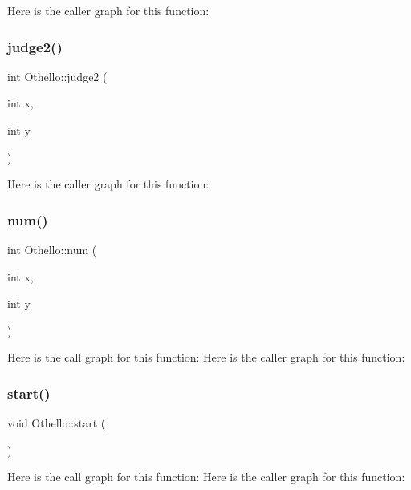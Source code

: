 Here is the caller graph for this function\+:
\hypertarget{class_othello_abaa0a512973fc53bc75c9cae3ca4f478}{}\label{class_othello_abaa0a512973fc53bc75c9cae3ca4f478} 
\subsubsection{\texorpdfstring{judge2()}{judge2()}}
{\footnotesize\ttfamily int Othello\+::judge2 (\begin{DoxyParamCaption}\item[{int}]{x,  }\item[{int}]{y }\end{DoxyParamCaption})}

Here is the caller graph for this function\+:
\hypertarget{class_othello_a2cb68488152c90c5cfc916b62333d3b1}{}\label{class_othello_a2cb68488152c90c5cfc916b62333d3b1} 
\subsubsection{\texorpdfstring{num()}{num()}}
{\footnotesize\ttfamily int Othello\+::num (\begin{DoxyParamCaption}\item[{int}]{x,  }\item[{int}]{y }\end{DoxyParamCaption})}

Here is the call graph for this function\+:
Here is the caller graph for this function\+:
\hypertarget{class_othello_afbd303f619ad4aa032aac05745f333cd}{}\label{class_othello_afbd303f619ad4aa032aac05745f333cd} 
\subsubsection{\texorpdfstring{start()}{start()}}
{\footnotesize\ttfamily void Othello\+::start (\begin{DoxyParamCaption}{ }\end{DoxyParamCaption})}

Here is the call graph for this function\+:
Here is the caller graph for this function\+:
\hypertarget{class_othello_aa988281f6c8107e7d078de68e9ae9d3d}{}\label{class_othello_aa988281f6c8107e7d078de68e9ae9d3d} 
